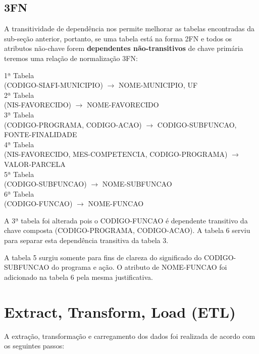 \documentclass[12pt]{article}
\begin{document}
	\subsection{3FN}
	\label{sec:3fn}
	
	A transitividade de dependência nos permite melhorar as tabelas encontradas da sub-seção anterior, portanto, se uma tabela está na forma 2FN e todos os atributos não-chave forem \textbf{dependentes não-transitivos} de chave primária teremos uma relação de normalização 3FN:
	
	\begin{center}
		1$ª$ Tabela \\ (CODIGO-SIAFI-MUNICIPIO) $\rightarrow$ NOME-MUNICIPIO, UF \\
		2$ª$ Tabela \\
		(NIS-FAVORECIDO) $\rightarrow$ NOME-FAVORECIDO \\
		3$ª$ Tabela \\
		(CODIGO-PROGRAMA, CODIGO-ACAO) $\rightarrow$ CODIGO-SUBFUNCAO, FONTE-FINALIDADE \\
		4$ª$ Tabela \\
		(NIS-FAVORECIDO, MES-COMPETENCIA, CODIGO-PROGRAMA) $\rightarrow$ VALOR-PARCELA \\
		5$ª$ Tabela \\
		(CODIGO-SUBFUNCAO) $\rightarrow$ NOME-SUBFUNCAO \\
		6$ª$ Tabela \\
		(CODIGO-FUNCAO) $\rightarrow$ NOME-FUNCAO 
		\label{tab:3fn} 
	\end{center} 
	
		A 3$ª$ tabela foi alterada pois o CODIGO-FUNCAO é dependente transitivo da chave composta (CODIGO-PROGRAMA, CODIGO-ACAO). A tabela 6 serviu para separar esta dependência transitiva da tabela 3. 
		
		A tabela 5 surgiu somente para fins de clareza do significado do CODIGO-SUBFUNCAO do programa e ação. O atributo de NOME-FUNCAO foi adicionado na tabela 6 pela mesma justificativa.
	
	\section{Extract, Transform, Load (ETL)}
	\label{sec:etl}
	
	A extração, transformação e carregamento dos dados foi realizada de acordo com os seguintes passos:
	
\end{document}
